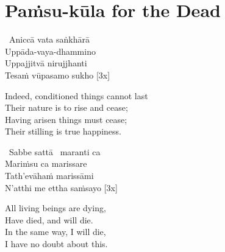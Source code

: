 \suttaRef{[Khp 7]}

\section{Paṁsu-kūla for the Dead}
\label{pamsu-kula-dead}

\vspace{-0.8em}

\begin{pali-hang}
\anglebracketleft\ \hspace{-0.5mm}Aniccā vata saṅkhārā \hspace{-0.5mm}\anglebracketright\ \\
Uppāda-vaya-dhammino\\
Uppajjitvā nirujjhanti\\
Tesaṁ vūpasamo sukho \hfill{[3x]}
\end{pali-hang}

\begin{english-verses}
  Indeed, conditioned things cannot last\\
  Their nature is to rise and cease;\hyperlink{endnote132-appendix}{\hypertarget{endnote132-body}{}}\\
  Having arisen things must cease;\\
  Their stilling is true happiness.
\end{english-verses}

\suttaRef{[DN 16]}

\begin{pali-hang-continued}
\anglebracketleft\ \hspace{-0.5mm}Sabbe sattā \hspace{-0.5mm}\anglebracketright\ maranti ca\\
Mariṁsu ca marissare\\
Tath'evāhaṁ marissāmi\\
N'atthi me ettha saṁsayo \hfill{[3x]}
\end{pali-hang-continued}

\begin{english-verses}
  All living beings are dying,\\
  Have died, and will die.\\
  In the same way, I will die,\\
  I have no doubt about this.
\end{english-verses}

\suttaRef{[Thai]}

